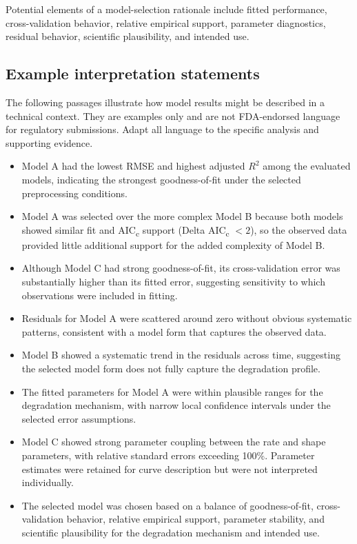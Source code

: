 Potential elements of a model-selection rationale include fitted performance, cross-validation behavior, relative empirical support, parameter diagnostics, residual behavior, scientific plausibility, and intended use.


\subsection{Example interpretation statements}

The following passages illustrate how model results might be described in a technical context. They are examples only and are not FDA-endorsed language for regulatory submissions. Adapt all language to the specific analysis and supporting evidence.

\begin{itemize}
    \item Model A had the lowest RMSE and highest adjusted $R^2$ among the evaluated models, indicating the strongest goodness-of-fit under the selected preprocessing conditions.
    \item Model A was selected over the more complex Model B because both models showed similar fit and AIC\textsubscript{c} support (Delta AIC\textsubscript{c} $<2$), so the observed data provided little additional support for the added complexity of Model B.
    \item Although Model C had strong goodness-of-fit, its cross-validation error was substantially higher than its fitted error, suggesting sensitivity to which observations were included in fitting.
    \item Residuals for Model A were scattered around zero without obvious systematic patterns, consistent with a model form that captures the observed data.
    \item Model B showed a systematic trend in the residuals across time, suggesting the selected model form does not fully capture the degradation profile.
    \item The fitted parameters for Model A were within plausible ranges for the degradation mechanism, with narrow local confidence intervals under the selected error assumptions.
    \item Model C showed strong parameter coupling between the rate and shape parameters, with relative standard errors exceeding 100\%. Parameter estimates were retained for curve description but were not interpreted individually.
    \item The selected model was chosen based on a balance of goodness-of-fit, cross-validation behavior, relative empirical support, parameter stability, and scientific plausibility for the degradation mechanism and intended use.
\end{itemize}


